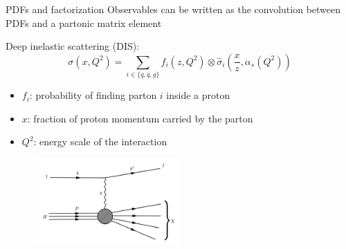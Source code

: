 \documentclass[8pt,t]{beamer}
\begin{document}



\begin{frame}{PDFs and factorization}
  Observables can be written as the convolution between PDFs and a partonic matrix element

  \vspace*{1em}
  Deep inelastic scattering (DIS):
  \begin{equation*}
    \sigma\left(x, Q^2\right)=\sum_{i\in \{q,\bar{q},g\}} f_i\left(z, Q^2\right) \otimes \hat{\sigma}_i\left(\frac{x}{z}, \alpha_s(Q^2)\right)
  \end{equation*}
  \begin{itemize}
    \item $f_i$: probability of finding parton $i$ inside a proton
    \item $x$: fraction of proton momentum carried by the parton
    \item $Q^2$: energy scale of the interaction
  \end{itemize}

  \begin{figure}
    \includegraphics[width=0.5\textwidth]{dis_schematic.png}
  \end{figure}

\end{frame}
\end{document}
